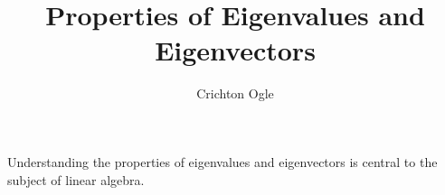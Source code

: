 \documentclass{ximera}
\title{Properties of Eigenvalues and Eigenvectors}
\author{Crichton Ogle}
\begin{document}
\begin{abstract}
\end{abstract}
\maketitle

Understanding the properties of eigenvalues and eigenvectors is
central to the subject of linear algebra.
\end{document}
